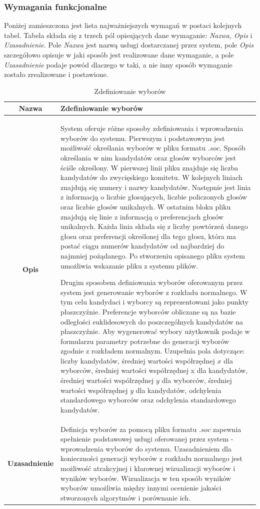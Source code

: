 \documentclass[polish,11pt]{aghthesis}
\begin{document}
\subsubsection{Wymagania funkcjonalne}
Poniżej zamieszczona jest lista najważniejszych wymagań w postaci kolejnych tabel. Tabela składa się z trzech pól opisujących dane wymaganie: \textit{Nazwa, Opis} i \textit{Uzasadnienie}. Pole \textit{Nazwa} jest nazwą usługi dostarczanej przez system, pole \textit{Opis} szczegółowo opisuje w jaki sposób jest realizowane dane wymaganie, a pole \textit{Uzasadnienie} podaje powód dlaczego w taki, a nie inny sposób wymaganie zostało zrealizowane i postawione.
\newpage
\begin{table}
\centering
\begin{tabular}{|c|p{12.5cm}|}
\hline
\textbf{Nazwa} & Zdefiniowanie wyborów \\ 
\hline 
\textbf{Opis} & System oferuje różne sposoby zdefiniowania i wprowadzenia wyborów
do systemu. Pierwszym i podstawowym jest możliwość określania
wyborów w pliku formatu $.soc$. Sposób określania w nim kandydatów
oraz głosów wyborców jest ściśle określony. W pierwszej linii pliku
znajduje się liczba kandydatów do zwycięskiego komitetu. W kolejnych
liniach znajdują się numery i nazwy kandydatów. Następnie jest linia z
informacją o liczbie głosujących, liczbie policzonych głosów oraz liczbie
głosów unikalnych. W ostatnim bloku pliku znajdują się linie z
informacją o preferencjach głosów unikalnych. Każda linia składa się z
liczby powtórzeń danego głosu oraz preferencji określonej dla tego
głosu, która ma postać ciągu numerów kandydatów od najbardziej do
najmniej pożądanego. Po stworzeniu opisanego pliku system umożliwia
wskazanie pliku z systemu plików.

Drugim sposobem definiowania wyborów oferowanym przez system
jest generowanie wyborów z rozkładu normalnego. W tym celu
kandydaci i wyborcy są reprezentowani jako punkty płaszczyźnie.
Preferencje wyborców obliczane są na bazie odległości euklidesowych
do poszczególnych kandydatów na płaszczyźnie. Aby wygenerować
wybory użytkownik podaje w formularzu parametry potrzebne do
generacji wyborów zgodnie z rozkładem normalnym. Uzupełnia pola
dotyczące: liczby kandydatów, średniej wartości współrzędnej $x$ dla
wyborców, średniej wartości współrzędnej x dla kandydatów, średniej
wartości współrzędnej $y$ dla wyborców, średniej wartości współrzędnej
$y$ dla kandydatów, odchylenia standardowego wyborców oraz
odchylenia standardowego kandydatów. \\ 
\hline 
\textbf{Uzasadnienie} & Definicja wyborów za pomocą pliku formatu $.soc$ zapewnia spełnienie
podstawowej usługi oferowanej przez system - wprowadzenia wyborów
do systemu. Uzasadnieniem dla konieczności generacji wyborów z
rozkładu normalnego jest możliwość atrakcyjnej i klarownej wizualizacji
wyborów i wyników wyborów. Wizualizacja w ten sposób wyników
wyborów umożliwia między innymi ocenienie jakości stworzonych
algorytmów i porównanie ich.\\ 
\hline 
\end{tabular}
\caption{Zdefiniowanie wyborów} 
\end{table}
\end{document}
